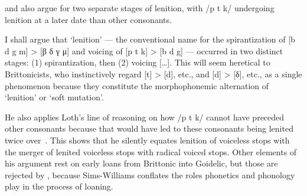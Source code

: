 \message{ !name(../main.tex)}\documentclass[
a4paper,
12pt,
twoside,
openright
]{memoir}
\newcommand{\onesp}[1]{\begin{spacing}{1}#1\end{spacing}}
\newcommand{\tqt}[3]{%
  \begin{displayquote}%
    {\small\onesp{#1~\autocite[#3]{#2}}}%
    \end{displayquote}%
  }%
\begin{document}
\Textcite[162]{Foer_Flussname41} and \Textcite{sims-williams_dating_1990} also argue for two separate stages of lenition, with /p t k/ undergoing lenition at a later date than other consonants.
\tqt{I shall argue that `lenition' — the conventional name for the spirantization of [b d g m] > [β δ γ μ] and voicing of [p t k] > [b d g] — occurred in two distinct stages: (1) spirantization, then (2) voicing […]. This will seem heretical to Brittonicists, who instinctively regard [t] > [d], etc., and [d] > [δ], etc., as a single phenomenon because they constitute the morphophonemic alternation of `lenition' or `soft mutation'.}{sims-williams_dating_1990}{221}
He also applies Loth's line of reasoning on how /p t k/ cannot have preceded other consonants because that would have led to these consonants being lenited twice over~\autocite[232]{sims-williams_dating_1990}. This shows that he silently equates lenition of voiceless stops with the merger of lenited voiceless stops with radical voiced stops. Other elements of his argument rest on early loans from Brittonic into Goidelic, but those are rejected by \textcite{isaac_chronology_2004}, because Sims-Williams conflates the roles  phonetics and phonology play in the process of loaning.




\end{document}
